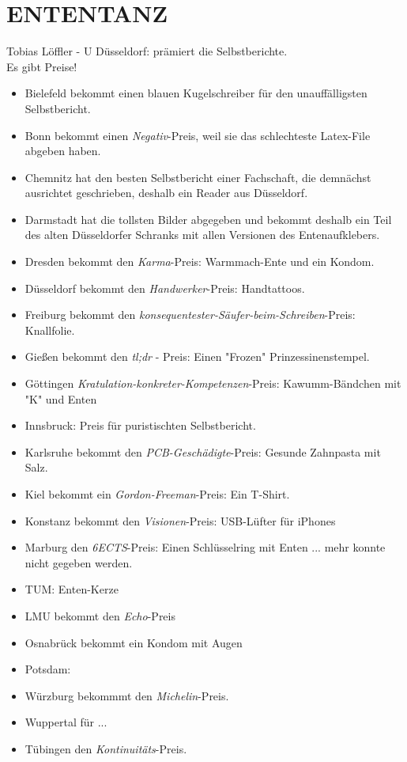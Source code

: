 \newpage
\section{ENTENTANZ}
  Tobias Löffler - U Düsseldorf:  prämiert die Selbstberichte. \\
  Es gibt Preise!
  \begin{itemize}
    \item Bielefeld bekommt einen blauen Kugelschreiber für den unauffälligsten Selbstbericht.
    \item Bonn bekommt einen \textit{Negativ}-Preis, weil sie das schlechteste Latex-File abgeben haben.
    \item Chemnitz hat den besten Selbstbericht einer Fachschaft, die demnächst ausrichtet geschrieben, deshalb ein Reader aus Düsseldorf.
    \item Darmstadt hat die tollsten Bilder abgegeben und bekommt deshalb ein Teil des alten Düsseldorfer Schranks mit allen Versionen des Entenaufklebers.
    \item Dresden bekommt den \textit{Karma}-Preis: Warmmach-Ente und ein Kondom.
    \item Düsseldorf bekommt den \textit{Handwerker}-Preis: Handtattoos.
    \item Freiburg bekommt den \textit{konsequentester-Säufer-beim-Schreiben}-Preis: Knallfolie.
    \item Gießen bekommt den \textit{tl;dr} - Preis: Einen "Frozen" Prinzessinenstempel.
    \item Göttingen \textit{Kratulation-konkreter-Kompetenzen}-Preis: Kawumm-Bänd\-chen mit "K" und Enten
    \item Innsbruck: Preis für puristischten Selbstbericht.
    \item Karlsruhe bekommt den \textit{PCB-Geschädigte}-Preis: Gesunde Zahnpasta mit Salz.
    \item Kiel bekommt ein \textit{Gordon-Freeman}-Preis: Ein T-Shirt.
    \item Konstanz bekommt den \textit{Visionen}-Preis: USB-Lüfter für iPhones
    \item Marburg den \textit{6ECTS}-Preis: Einen Schlüsselring mit Enten ... mehr konnte nicht gegeben werden.
    \item TUM: Enten-Kerze
    \item LMU bekommt den \textit{Echo}-Preis
    \item Osnabrück bekommt ein Kondom mit Augen
    \item Potsdam:
    \item Würzburg bekommmt den \textit{Michelin}-Preis.
    \item Wuppertal für ...
    \item Tübingen den \textit{Kontinuitäts}-Preis.
  \end{itemize}

